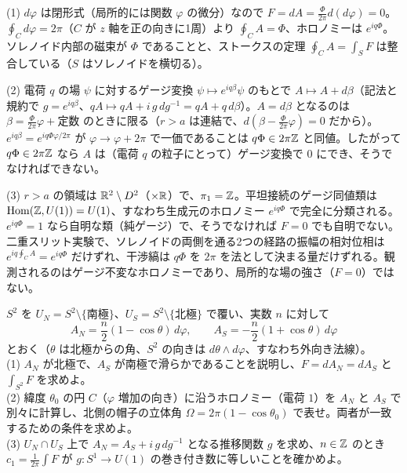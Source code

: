 \begin{solution}
(1) $d\varphi$ は閉形式（局所的には関数 $\varphi$ の微分）なので $F=dA=\frac{\Phi}{2\pi}d(d\varphi)=0$。$\oint_Cd\varphi=2\pi$（$C$ が $z$ 軸を正の向きに1周）より $\oint_CA=\Phi$、ホロノミーは $e^{iq\Phi}$。ソレノイド内部の磁束が $\Phi$ であることと、ストークスの定理 $\oint_CA=\int_SF$ は整合している（$S$ はソレノイドを横切る）。

(2) 電荷 $q$ の場 $\psi$ に対するゲージ変換 $\psi\mapsto e^{iq\beta}\psi$ のもとで $A\mapsto A+d\beta$（記法と規約で $g=e^{iq\beta}$、$qA\mapsto qA+i\,g\,dg^{-1}=qA+q\,d\beta$）。$A=d\beta$ となるのは $\beta=\frac{\Phi}{2\pi}\varphi+\text{定数}$ のときに限る（$r>a$ は連結で、$d(\beta-\frac{\Phi}{2\pi}\varphi)=0$ だから）。$e^{iq\beta}=e^{iq\Phi\varphi/2\pi}$ が $\varphi\to\varphi+2\pi$ で一価であることは $q\Phi\in2\pi\mathbb{Z}$ と同値。したがって $q\Phi\in2\pi\mathbb{Z}$ なら $A$ は（電荷 $q$ の粒子にとって）ゲージ変換で $0$ にでき、そうでなければできない。

(3) $r>a$ の領域は $\mathbb{R}^2\setminus D^2$（$\times\mathbb{R}$）で、$\pi_1=\mathbb{Z}$。平坦接続のゲージ同値類は $\operatorname{Hom}(\mathbb{Z},U(1))=U(1)$、すなわち生成元のホロノミー $e^{iq\Phi}$ で完全に分類される。$e^{iq\Phi}=1$ なら自明な類（純ゲージ）で、そうでなければ $F=0$ でも自明でない。二重スリット実験で、ソレノイドの両側を通る2つの経路の振幅の相対位相は $e^{iq\oint_CA}=e^{iq\Phi}$ だけずれ、干渉縞は $q\Phi$ を $2\pi$ を法として決まる量だけずれる。観測されるのはゲージ不変なホロノミーであり、局所的な場の強さ（$F=0$）ではない。
\end{solution}

\begin{problem}[難易度 B]\label{ch08-prob-monopole}
$S^2$ を $U_N=S^2\setminus\{\text{南極}\}$、$U_S=S^2\setminus\{\text{北極}\}$ で覆い、実数 $n$ に対して
\[
A_N=\frac n2(1-\cos\theta)\,d\varphi,\qquad A_S=-\frac n2(1+\cos\theta)\,d\varphi
\]
とおく（$\theta$ は北極からの角、$S^2$ の向きは $d\theta\wedge d\varphi$、すなわち外向き法線）。\\
(1) $A_N$ が北極で、$A_S$ が南極で滑らかであることを説明し、$F=dA_N=dA_S$ と $\int_{S^2}F$ を求めよ。\\
(2) 緯度 $\theta_0$ の円 $C$（$\varphi$ 増加の向き）に沿うホロノミー（電荷 $1$）を $A_N$ と $A_S$ で別々に計算し、北側の帽子の立体角 $\Omega=2\pi(1-\cos\theta_0)$ で表せ。両者が一致するための条件を求めよ。\\
(3) $U_N\cap U_S$ 上で $A_N=A_S+i\,g\,dg^{-1}$ となる推移関数 $g$ を求め、$n\in\mathbb{Z}$ のとき $c_1=\frac1{2\pi}\int F$ が $g\colon S^1\to U(1)$ の巻き付き数に等しいことを確かめよ。
\end{problem}


